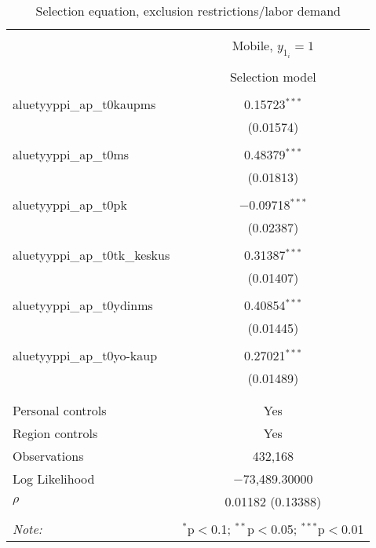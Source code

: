 
\begin{table}[!htbp] \centering 
  \caption{Selection equation, exclusion restrictions/labor demand} 
  \label{} 
\begin{tabular}{@{\extracolsep{5pt}}lc} 
\\[-1.8ex]\hline 
\hline \\[-1.8ex] 
 & \multicolumn{1}{c}{Mobile, $y_{1_i} = 1$} \\ 
\cline{2-2} 
\\[-1.8ex] & Selection model \\ 
\hline \\[-1.8ex] 
 aluetyyppi\_ap\_t0kaupms & 0.15723$^{***}$ \\ 
  & (0.01574) \\ 
  & \\ 
 aluetyyppi\_ap\_t0ms & 0.48379$^{***}$ \\ 
  & (0.01813) \\ 
  & \\ 
 aluetyyppi\_ap\_t0pk & $-$0.09718$^{***}$ \\ 
  & (0.02387) \\ 
  & \\ 
 aluetyyppi\_ap\_t0tk\_keskus & 0.31387$^{***}$ \\ 
  & (0.01407) \\ 
  & \\ 
 aluetyyppi\_ap\_t0ydinms & 0.40854$^{***}$ \\ 
  & (0.01445) \\ 
  & \\ 
 aluetyyppi\_ap\_t0yo-kaup & 0.27021$^{***}$ \\ 
  & (0.01489) \\ 
  & \\ 
\hline \\[-1.8ex] 
Personal controls & Yes \\ 
Region controls & Yes \\ 
Observations & 432,168 \\ 
Log Likelihood & $-$73,489.30000 \\ 
$\rho$ & 0.01182  (0.13388) \\ 
\hline 
\hline \\[-1.8ex] 
\textit{Note:}  & \multicolumn{1}{r}{$^{*}$p$<$0.1; $^{**}$p$<$0.05; $^{***}$p$<$0.01} \\ 
\end{tabular} 
\end{table} 

